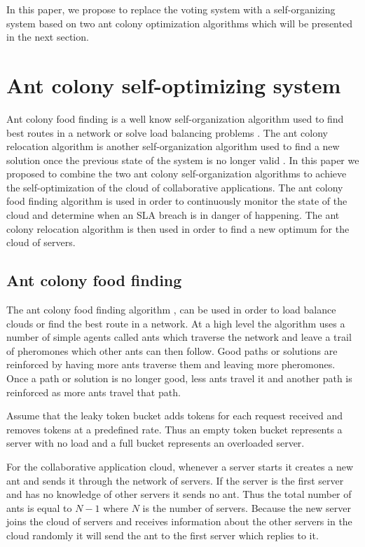\documentclass{sig-alternate}
\begin{document}
In this paper, we propose to replace the voting system with a self-organizing system based on two ant colony optimization algorithms which will be presented in the next section.

\section{Ant colony self-optimizing system}
\label{sec:solution}

Ant colony food finding is a well know self-organization algorithm used to find best routes in a network \cite{antalgorithm} or solve load balancing problems \cite{antalgofood}. The ant colony relocation algorithm is another self-organization algorithm used to find a new solution once the previous state of the system is no longer valid \cite{}. In this paper we proposed to combine the two ant colony self-organization algorithms to achieve the self-optimization of the cloud of collaborative applications. The ant colony food finding algorithm is used in order to continuously monitor the state of the cloud and determine when an SLA breach is in danger of happening. The ant colony relocation algorithm is then used in order to find a new optimum for the cloud of servers.

\subsection{Ant colony food finding}

The ant colony food finding algorithm \cite{antalgorithm}, \cite{antalgofood} can be used in order to load balance clouds or find the best route in a network. At a high level the algorithm uses a number of simple agents called ants which traverse the network and leave a trail of pheromones which other ants can then follow. Good paths or solutions are reinforced by having more ants traverse them and leaving more pheromones. Once a path or solution is no longer good, less ants travel it and another path is reinforced as more ants travel that path.

Assume that the leaky token bucket adds tokens for each request received and removes tokens at a predefined rate. Thus an empty token bucket represents a server with no load and a full bucket represents an overloaded server.

For the collaborative application cloud, whenever a server starts it creates a new ant and sends it through the network of servers. If the server is the first server and has no knowledge of other servers it sends no ant. Thus the total number of ants is equal to $N - 1$ where $N$ is the number of servers. Because the new server joins the cloud of servers and receives information about the other servers in the cloud randomly it will send the ant to the first server which replies to it. 
\end{document}

